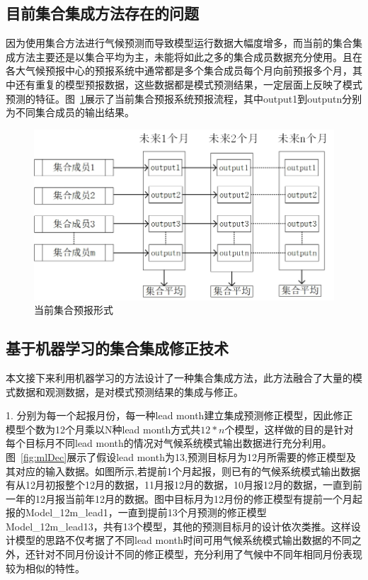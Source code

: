 \subsection{目前集合集成方法存在的问题}
因为使用集合方法进行气候预测而导致模型运行数据大幅度增多，而当前的集合集成方法主要还是以集合平均为主，未能将如此之多的集合成员数据充分使用。且在各大气候预报中心的预报系统中通常都是多个集合成员每个月向前预报多个月，其中还有重复的模型预报数据，这些数据都是模式预测结果，一定层面上反映了模式预测的特征。图~\ref{fig:current ensem }展示了当前集合预报系统预报流程，其中output1到outputn分别为不同集合成员的输出结果。

\begin{figure}[H] %
\label{prectresult}
  \centering
  \includegraphics{figures/当前集合预报形式.jpg}
  \caption{当前集合预报形式}
  \label{fig:current ensem }
\end{figure}

\subsection{基于机器学习的集合集成修正技术}
本文接下来利用机器学习的方法设计了一种集合集成方法，此方法融合了大量的模式数据和观测数据，是对模式预测结果的集成与修正。

1. 分别为每一个起报月份，每一种lead month建立集成预测修正模型，因此修正模型个数为12个月乘以N种lead month方式共$12*n$个模型，这样做的目的是针对每个目标月不同lead month的情况对气候系统模式输出数据进行充分利用。图~\ref{fig:mlDec}展示了假设lead month为13,预测目标月为12月所需要的修正模型及其对应的输入数据。如图所示,若提前1个月起报，则已有的气候系统模式输出数据有从12月初报整个12月的数据，11月报12月的数据，10月报12月的数据，一直到前一年的12月报当前年12月的数据。图中目标月为12月份的修正模型有提前一个月起报的Model\_12m\_lead1，一直到提前13个月预测的修正模型Model\_12m\_lead13，共有13个模型，其他的预测目标月的设计依次类推。这样设计模型的思路不仅考据了不同lead month时间可用气候系统模式输出数据的不同之外，还针对不同月份设计不同的修正模型，充分利用了气候中不同年相同月份表现较为相似的特性。

